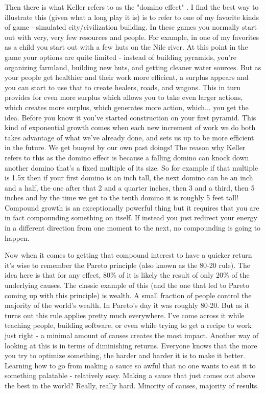 \documentclass[11pt]{book}
\begin{document}
Then there is what Keller refers to as the "domino effect" \cite{keller}. I find the best way to illustrate this (given what a long play it is) is to refer to one of my favorite kinds of game - simulated city/civilization building. In these games you normally start out with very, very few resources and people. For example, in one of my favorites as a child you start out with a few huts on the Nile river. At this point in the game your options are quite limited - instead of building pyramids, you're organizing farmland, building new huts, and getting cleaner water sources. But as your people get healthier and their work more efficient, a surplus appears and you can start to use that to create healers, roads, and wagons. This in turn provides for even more surplus which allows you to take even larger actions, which creates more surplus, which generates more action, which... you get the idea. Before you know it you've started construction on your first pyramid. This kind of exponential growth comes when each new increment of work we do both takes advantage of what we've already done, and sets us up to be more efficient in the future. We get buoyed by our own past doings! The reason why Keller refers to this as the domino effect is because a falling domino can knock down another domino that's a fixed multiple of its size. So for example if that multiple is 1.5x then if your first domino is an inch tall, the next domino can be an inch and a half, the one after that 2 and a quarter inches, then 3 and a third, then 5 inches and by the time we get to the tenth domino it is roughly 5 feet tall! Compound growth is an exceptionally powerful thing but it requires that you are in fact compounding something on itself. If instead you just redirect your energy in a different direction from one moment to the next, no compounding is going to happen.
\newline

Now when it comes to getting that compound interest to have a quicker return it's wise to remember the Pareto principle (also known as the 80-20 rule). The idea here is that for any effect, 80\% of it is likely the result of only 20\% of the underlying causes. The classic example of this (and the one that led to Pareto coming up with this principle) is wealth. A small fraction of people control the majority of the world's wealth. In Pareto's day it was roughly 80-20. But as it turns out this rule applies pretty much everywhere. I've come across it while teaching people, building software, or even while trying to get a recipe to work just right - a minimal amount of causes creates the most impact. Another way of looking at this is in terms of diminishing returns. Everyone knows that the more you try to optimize something, the harder and harder it is to make it better. Learning how to go from making a sauce so awful that no one wants to eat it to something palatable - relatively easy. Making a sauce that just comes out above the best in the world? Really, really hard. Minority of causes, majority of results. 
\newline
\end{document}

